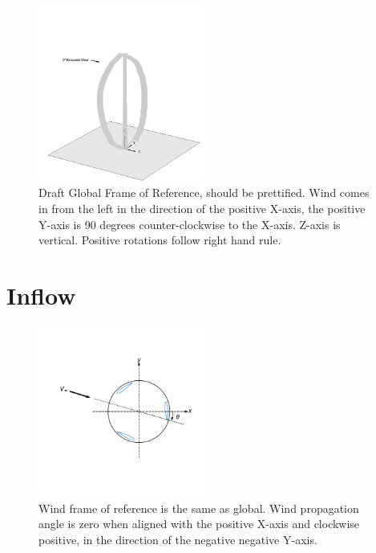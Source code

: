 \documentclass[11pt]{article}
\begin{document}
\begin{figure}[H]
\centering
\vspace{-12pt}
\includegraphics[trim={0 0 0 0},clip,width=0.5\textwidth]{../figs/global_FOR.png}
\vspace{-12pt}
\caption{Draft Global Frame of Reference, should be prettified.  Wind comes in from the left in the direction of the positive X-axis, the positive Y-axis is 90 degrees counter-clockwise to the X-axis.  Z-axis is vertical.  Positive rotations follow right hand rule.}
\label{fig:ac_velocities}
\end{figure}

\section{Inflow}

\begin{figure}[H]
\centering
\vspace{-12pt}
\includegraphics[trim={1.3cm 2.4cm .5cm 1.5cm},clip,width=0.5\textwidth]{../figs/inflow_wind}
\vspace{-12pt}
\caption{Wind frame of reference is the same as global.  Wind propagation angle is zero when aligned with the positive X-axis and clockwise positive, in the direction of the negative negative Y-axis.}
\label{fig:ac_velocities}
\end{figure}
\end{document}

